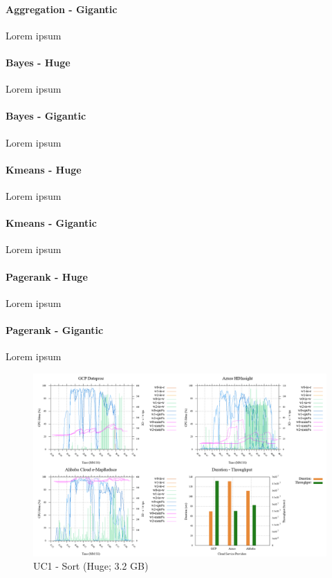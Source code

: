 \documentclass[review]{elsarticle}
\begin{document}
\paragraph{Aggregation - Gigantic} Lorem ipsum

\paragraph{Bayes - Huge} Lorem ipsum

\paragraph{Bayes - Gigantic} Lorem ipsum

\paragraph{Kmeans - Huge} Lorem ipsum

\paragraph{Kmeans - Gigantic} Lorem ipsum

\paragraph{Pagerank - Huge} Lorem ipsum

\paragraph{Pagerank - Gigantic} Lorem ipsum

\begin{figure}[b]
	\caption{UC1 - Sort (Huge; 3.2 GB)}
	\includegraphics[width=\textwidth]{uc1-srt-h-cmidt}
	\centering
\end{figure}
\end{document}

